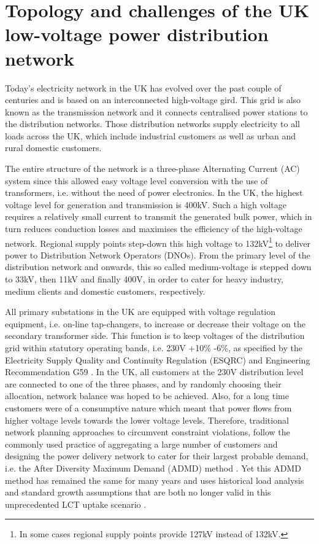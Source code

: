 \section{Topology and challenges of the UK low-voltage power distribution network}
\label{ch-literature:sec:topology-of-lv-network}

Today's electricity network in the UK has evolved over the past couple of centuries and is based on an interconnected high-voltage gird.
This grid is also known as the transmission network and it connects centralised power stations to the distribution networks.
Those distribution networks supply electricity to all loads across the UK, which include industrial customers as well as urban and rural domestic customers.

The entire structure of the network is a three-phase Alternating Current (AC) system since this allowed easy voltage level conversion with the use of transformers, i.e. without the need of power electronics.
In the UK, the highest voltage level for generation and transmission is 400kV.
Such a high voltage requires a relatively small current to transmit the generated bulk power, which in turn reduces conduction losses and maximises the efficiency of the high-voltage network.
Regional supply points step-down this high voltage to 132kV\footnote{In some cases regional supply points provide 127kV instead of 132kV.} to deliver power to Distribution Network Operators (DNOs).
From the primary level of the distribution network and onwards, this so called medium-voltage is stepped down to 33kV, then 11kV and finally 400V, in order to cater for heavy industry, medium clients and domestic customers, respectively.


All primary substations in the UK are equipped with voltage regulation equipment, i.e. on-line tap-changers, to increase or decrease their voltage on the secondary transformer side.
This function is to keep voltages of the distribution grid within statutory operating bands, i.e. 230V +10\% -6\%, as specified by the Electricity Supply Quality and Continuity Regulation (ESQRC) \cite{HealthandSafetyExecutive2002} and Engineering Recommendation G59 \cite{EnergyNetworksAssociation2013}.
In the UK, all customers at the 230V distribution level are connected to one of the three phases, and by randomly choosing their allocation, network balance was hoped to be achieved.
Also, for a long time customers were of a consumptive nature which meant that power flows from higher voltage levels towards the lower voltage levels.
Therefore, traditional network planning approaches to circumvent constraint violations, follow the commonly used practice of aggregating a large number of customers and designing the power delivery network to cater for their largest probable demand, i.e. the After Diversity Maximum Demand (ADMD) method \cite{Richardson2010a}.
Yet this ADMD method has remained the same for many years and uses historical load analysis and standard growth assumptions that are both no longer valid in this unprecedented LCT uptake scenario \cite{Yunusov2016}.



